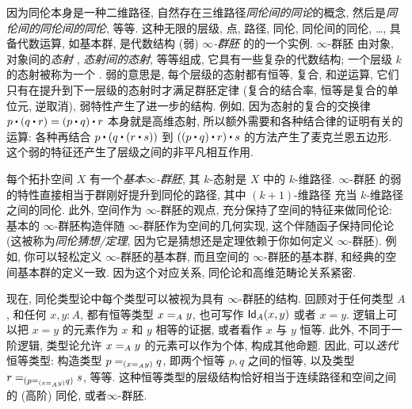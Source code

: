 因为同伦本身是一种二维路径, 自然存在三维路径\emph{同伦间的同论}的概念,
%
然后是\emph{同伦间的同伦间的同伦}, 等等.
这种无限的层级, 点, 路径, 同伦, 同伦间的同伦, \ldots, 具备代数运算, 如基本群, 是代数结构 (弱) \emph{$\infty$-群胚} 的的一个实例.
$\infty$-群胚 由对象, 对象间的\emph{态射}%
, \emph{态射间的态射}, 等等组成, 它具有一些复杂的代数结构;
一个层级 $k$ 的态射被称为一个 .
弱的意思是, 每个层级的态射都有恒等, 复合, 和逆运算, 它们只有在提升到下一层级的态射时才满足群胚定律 (复合的结合率, 恒等是复合的单位元, 逆取消), 弱特性产生了进一步的结构.
例如, 因为态射的复合的交换律 $p \ct (q \ct r) = (p \ct q) \ct r$ 本身就是高维态射, 所以额外需要和各种结合律的证明有关的运算: 各种再结合 $p \ct (q \ct (r \ct s))$ 到 $((p \ct q) \ct r) \ct s$ 的方法产生了麦克兰恩五边形.
这个弱的特征还产生了层级之间的非平凡相互作用.

每个拓扑空间 $X$ 有一个\emph{基本$\infty$-群胚},
%
%
其 $k$-态射是 $X$ 中的 $k$-维路径.
$\infty$-群胚 的弱的特性直接相当于群刚好提升到同伦的路径, 其中 $(k+1)$-维路径 充当 $k$-维路径之间的同伦.
此外, 空间作为 $\infty$-群胚的观点, 充分保持了空间的特征来做同伦论: 基本的 $\infty$-群胚构造伴随 $\infty$-群胚作为空间的几何实现, 这个伴随函子保持同伦论
(这被称为\emph{同伦猜想/定理}, 
%
因为它是猜想还是定理依赖于你如何定义 $\infty$-群胚).
例如, 你可以轻松定义 $\infty$-群胚的基本群, 而且空间的 $\infty$-群胚的基本群, 和经典的空间基本群的定义一致.
因为这个对应关系, 同伦论和高维范畴论关系紧密.

%
%

\mentalpause

现在, 同伦类型论中每个类型可以被视为具有 $\infty$-群胚的结构.
回顾对于任何类型 $A$, 和任何 $x,y:A$, 都有恒等类型 $\id[A]{x}{y}$, 也可写作 $\idtype[A]{x}{y}$ 或者 $x=y$.
逻辑上可以把 $x=y$ 的元素作为 $x$ 和 $y$ 相等的证据, 或者看作 $x$ 与 $y$ 恒等. 此外, 不同于一阶逻辑, 类型论允许 $\id[A]{x}{y}$ 的元素可以作为个体, 构成其他命题.
因此, 可以\emph{迭代}恒等类型: 构造类型
$\id[{(\id[A]{x}{y})}]{p}{q}$, 即两个恒等 $p,q$ 之间的恒等, 以及类型 $\id[{(\id[{(\id[A]{x}{y})}]{p}{q})}]{r}{s}$, 等等.
这种恒等类型的层级结构恰好相当于连续路径和空间之间的 (高阶) 同伦, 或者$\infty$-群胚.


